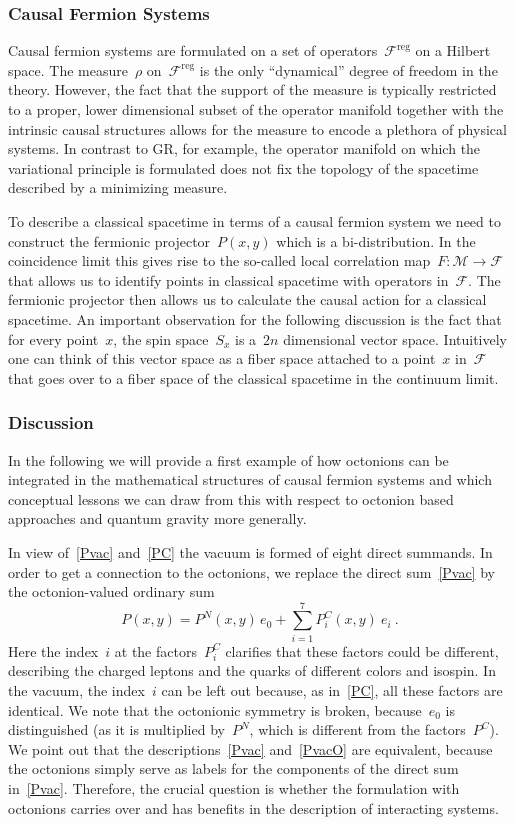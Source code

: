 \documentclass[reqno,11pt]{amsart}
\numberwithin{equation}{section}
\newcommand{\beq}{\begin{equation}}
\newcommand{\eeq}{\end{equation}}
\newcommand{\1}{\mbox{\rm 1 \hspace{-1.05 em} 1}}
\newcommand{\F}{{\mathscr{F}}}
\begin{document}
\subsubsection{Causal Fermion Systems}
Causal fermion systems are formulated on a set of operators~$\F^{\text{reg}}$ on a Hilbert space.
The measure~$\rho$ on~$\F^{\text{reg}}$
is the only ``dynamical'' degree of freedom in the theory. However, the fact that the support of the measure is typically restricted to a proper, lower dimensional subset of the operator manifold together with the intrinsic causal structures allows for the measure to encode a plethora of physical systems. In contrast to GR, for example, the operator manifold on which the variational principle is formulated does not fix the topology of the spacetime described by a minimizing measure. 

To describe a classical spacetime in terms of a causal fermion system we need to construct the fermionic projector~$P(x,y)$ which is a bi-distribution. In the coincidence limit this gives rise to the so-called local correlation map~$F: \mathcal{M}\rightarrow \F$ that allows us to identify points in classical spacetime with operators in~$\F$. The fermionic projector then allows us to calculate the causal action for a classical spacetime. An important observation for the following discussion is the fact that for every point~$x$, the spin space~$S_x$ is a~$2n$ dimensional vector space. Intuitively one can think of this vector space as a fiber space attached to a point~$x$ in~$\F$ that goes over to a fiber space of the classical spacetime in the continuum limit.




\subsubsection{Discussion}
In the following we will provide a first example of how octonions can be integrated in the mathematical structures of causal fermion systems and which conceptual lessons we can draw from this with respect to octonion based approaches and quantum gravity more generally. 

In view of~\eqref{Pvac} and~\eqref{PC} the vacuum is formed of eight direct summands.
In order to get a connection to the octonions, we replace the direct sum~\eqref{Pvac} by the octonion-valued ordinary sum
\beq
P(x,y) = P^N(x,y) \, e_0 + \sum_{i=1}^7 P^C_i(x,y)\: e_i \:. \label{PvacO}
\eeq
Here the index~$i$ at the factors~$P^C_i$ clarifies
that these factors could be different, describing the charged leptons
and the quarks of different colors and isospin. In the vacuum, the index~$i$ can be left out because,
as in~\eqref{PC}, all these factors are identical.
We note that the octonionic symmetry is broken, because~$e_0$ is distinguished
(as it is multiplied by~$P^N$, which is different from the factors~$P^C$).
We point out that the descriptions~\eqref{Pvac} and~\eqref{PvacO} are equivalent,
because the octonions simply serve as labels for the components of the direct sum in~\eqref{Pvac}.
Therefore, the crucial question is whether the formulation with octonions carries over and has
benefits in the description of interacting systems.
\end{document}
